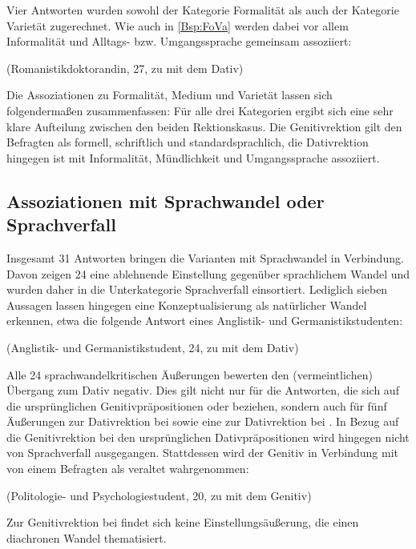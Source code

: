 Vier Antworten wurden sowohl der Kategorie \glqq Formalität\grqq{} als auch der Kategorie \glqq Varietät\grqq{} zugerechnet. 
Wie auch in \autoref{Bsp:FoVa} werden dabei vor allem Informalität und Alltags- bzw. Umgangssprache gemeinsam assoziiert:
\begin{exe}
\ex {} (Romanistikdoktorandin, 27, zu \dank{} mit dem Dativ) \label{Bsp:FoVa}
\end{exe}
Die Assoziationen zu Formalität, Medium und Varietät lassen sich folgendermaßen zusammenfassen: 
Für alle drei Kategorien ergibt sich eine sehr klare Aufteilung zwischen den beiden Rektionskasus. 
Die Genitivrektion gilt den Befragten als formell, schriftlich und standardsprachlich, die Dativrektion hingegen ist mit Informalität, Mündlichkeit und Umgangssprache assoziiert.  
\subsection{Assoziationen mit Sprachwandel oder Sprachverfall}
\label{sec:ErgAssSprachwandel}
Insgesamt 31 Antworten bringen die Varianten mit Sprachwandel in Verbindung. 
Davon zeigen 24 eine ablehnende Einstellung gegenüber sprachlichem Wandel und wurden daher in die Unterkategorie \glqq Sprachverfall\grqq{} einsortiert. 
Lediglich sieben Aussagen lassen hingegen eine Konzeptualisierung als natürlicher Wandel erkennen, etwa die folgende Antwort eines Anglistik- und Germanistikstudenten:
\begin{exe}
\ex {} (Anglistik- und Germanistikstudent, 24, zu \waehrend{} mit dem Dativ)
\end{exe} 
Alle 24 sprachwandelkritischen Äußerungen bewerten den (vermeintlichen) Übergang zum Dativ negativ. 
Dies gilt nicht nur für die Antworten, die sich auf die ursprünglichen Genitivpräpositionen \waehrend{} oder \wegen{} beziehen, sondern auch für fünf Äußerungen zur Dativrektion bei \dank{} sowie eine zur Dativrektion bei \gegenueber. 
In Bezug auf die Genitivrektion bei den ursprünglichen Dativpräpositionen wird hingegen nicht von Sprachverfall ausgegangen. 
Stattdessen wird der Genitiv in Verbindung mit \gegenueber{} von einem Befragten als veraltet wahrgenommen: 
\begin{exe}
\ex {} (Politologie- und Psychologiestudent, 20, zu \gegenueber{} mit dem Genitiv) 
\end{exe}
Zur Genitivrektion bei \dank{} findet sich keine Einstellungsäußerung, die einen diachronen Wandel thematisiert. 

